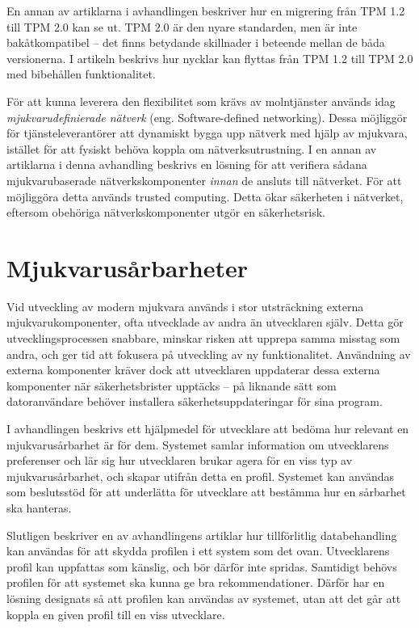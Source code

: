 En annan av artiklarna i avhandlingen beskriver hur en migrering från TPM 1.2 till TPM 2.0 kan se ut.
TPM 2.0 är den nyare standarden, men är inte bakåtkompatibel -- det finns betydande skillnader i beteende mellan de båda versionerna.
I artikeln beskrivs hur nycklar kan flyttas från TPM 1.2 till TPM 2.0 med bibehållen funktionalitet.

För att kunna leverera den flexibilitet som krävs av molntjänster används idag \emph{mjukvarudefinierade nätverk} (eng. Software-defined networking).
Dessa möjliggör för tjänsteleverantörer att dynamiskt bygga upp nätverk med hjälp av mjukvara, istället för att fysiskt behöva koppla om nätverksutrustning.
I en annan av artiklarna i denna avhandling beskrivs en lösning för att verifiera sådana mjukvarubaserade nätverkskomponenter \emph{innan} de ansluts till nätverket.
För att möjliggöra detta används trusted computing.
Detta ökar säkerheten i nätverket, eftersom obehöriga nätverkskomponenter utgör en säkerhetsrisk.

\section*{Mjukvarusårbarheter}

Vid utveckling av modern mjukvara används i stor utsträckning externa mjukvarukomponenter, ofta utvecklade av andra än utvecklaren själv.
Detta gör utvecklingsprocessen snabbare, minskar risken att upprepa samma misstag som andra, och ger tid att fokusera på utveckling av ny funktionalitet.
Användning av externa komponenter kräver dock att utvecklaren uppdaterar dessa externa komponenter när säkerhetsbrister upptäcks -- på liknande sätt som datoranvändare behöver installera säkerhetsuppdateringar för sina program.

I avhandlingen beskrivs ett hjälpmedel för utvecklare att bedöma hur relevant en mjukvarusårbarhet är för dem.
Systemet samlar information om utvecklarens preferenser och lär sig hur utvecklaren brukar agera för en viss typ av mjukvarusårbarhet, och skapar utifrån detta en profil.
Systemet kan användas som beslutsstöd för att underlätta för utvecklare att bestämma hur en sårbarhet ska hanteras.

Slutligen beskriver en av avhandlingens artiklar hur tillförlitlig databehandling kan användas för att skydda profilen i ett system som det ovan.
Utvecklarens profil kan uppfattas som känslig, och bör därför inte spridas.
Samtidigt behövs profilen för att systemet ska kunna ge bra rekommendationer.
Därför har en lösning designats så att profilen kan användas av systemet, utan att det går att koppla en given profil till en viss utvecklare.